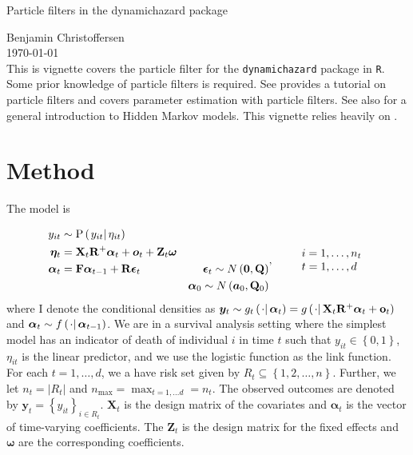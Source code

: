 \documentclass[notitlepage]{article}
\renewcommand{\vec}[1]{\bm{#1}}
\newcommand{\mat}[1]{\mathbf{#1}}
\newcommand{\Lbrace}[1]{\left\{ #1\right\}}
\newcommand{\Lparen}[1]{\left( #1\right)}
\newcommand{\Cond}[2]{\left. #1 \vphantom{#2} \right\vert  #2}
\newcommand{\Prob}{\text{P}}
\newcommand{\optor}[2]{#1\Lparen{#2}}
\newcommand{\optorC}[3]{\optor{#1}{\Cond{#2}{#3}}}
\newcommand{\propC}[2]{\optorC{\Prob}{#1}{#2}}
\newcommand{\nPeriods}{d}
\newcommand{\nMax}{n_{\text{max}}}
\newcommand*{\myTitle}{\begingroup
\centering
{\LARGE Particle filters in the dynamichazard package} \\[\baselineskip]
\scshape

Benjamin Christoffersen \\[\baselineskip]
\today \\[\baselineskip]
\vspace*{3\baselineskip}
\endgroup}
\begin{document}
\myTitle
This is vignette covers the particle filter for the \verb|dynamichazard| package in \verb|R|. Some prior knowledge of particle filters is required.  See \cite{doucet09} provides a tutorial on particle filters and \cite{kantas15} covers parameter estimation with particle filters. See also \cite{cappe05} for a general introduction to Hidden Markov models. This vignette relies heavily on \cite{fearnhead10}.

\section{Method}
The model is

\begin{equation}\label{eqn:model}
\begin{aligned}
 	y_{it} &\sim \propC{y_{it}}{\eta_{it}} &  \\
%
 	\vec{\eta}_{t} &= \mat{X}_t\mat{R}^{+}\vec{\alpha}_t + \vec{o}_t +  
 	\mat{Z}_t\vec{\omega} & \\
%
 	\vec{\alpha}_t &= \mat{F}\vec{\alpha}_{t - 1} + \mat{R}\vec{\epsilon}_t&
 		\vec{\epsilon}_t \sim N\Lparen{\vec{0}, \mat{Q}} \\
%
	& \vphantom{a} &	\vec{\alpha}_0 \sim N\Lparen{\vec{a}_0, \mat{Q}_0}
\end{aligned}, \qquad
%
\begin{array}{l} i = 1, \dots, n_t \\ t = 1, \dots, d \end{array}
\end{equation}%
%
where I  denote the conditional densities as $\vec{y}_t \sim \optorC{g_t}{\cdot}{\vec{\alpha}_t} = \optorC{g}{\cdot}{\mat{X}_t\mat{R}^{+}\vec{\alpha}_t + \mat{o}_t}$ and $\vec{\alpha}_t \sim \optorC{f}{\cdot}{\vec{\alpha}_{t-1}}$. We are in a survival analysis setting where the simplest model has an indicator of death of individual $i$ in time $t$ such that $y_{it} \in \Lbrace{0, 1}$, $\eta_{it}$ is the linear predictor, and we use the logistic function as the link function. For each $t=1,\dots,\nPeriods$, we a have risk set given by $R_t \subseteq \Lbrace{1,2,\dots,n}$. Further, we let $n_t = \vert R_t \vert$ and $\nMax = \max_{t = 1,\dots \nPeriods} = n_t$. The observed outcomes are denoted by $\vec{y}_t = \Lbrace{y_{it}}_{i \in R_t}$. $\mat{X}_t$ is the design matrix of the covariates and $\vec{\alpha}_t$ is the vector of time-varying coefficients. The $\mat{Z}_t$ is the design matrix for the fixed effects and $\vec{\omega}$ are the corresponding coefficients.
\end{document}
